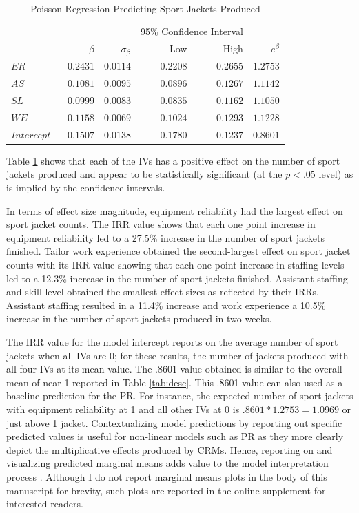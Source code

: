 \documentclass[doc]{apa7}
\begin{document}
	\begin{table}[h!]
		\centering
		\caption{\centering Poisson Regression Predicting Sport Jackets Produced} 
		\begin{tabular}{l|rrrrr}
			\hline %
			\multicolumn{1}{l}{} &  &  & \multicolumn{2}{c}{95\% Confidence Interval} &   \\ 
			\multicolumn{1}{l}{} & $\beta$ & $\sigma_{\beta}$ & Low & High & $e^{\beta}$ \\ 
			\hline %
			$ER$ & $0.2431$ & $0.0114$ & $0.2208$ & $0.2655$ & $1.2753$ \\  
			$AS$ & $0.1081$ & $0.0095$ & $0.0896$ & $0.1267$ & $1.1142$ \\ 
			$SL$ & $0.0999$ & $0.0083$ & $0.0835$ & $0.1162$ & $1.1050$ \\
			$WE$ & $0.1158$ & $0.0069$ & $0.1024$ & $0.1293$ & $1.1228$ \\ 
			$Intercept$ & $-0.1507$ & $0.0138$ & $-0.1780$ & $-0.1237$ & $0.8601$ \\
			\hline %
		\end{tabular}
		\label{tab:poisreg}
	\end{table}

	Table \ref{tab:poisreg} shows that each of the IVs has a positive effect on the number of sport jackets produced and appear to be statistically significant (at the $p < .05$ level) as is implied by the confidence intervals.
	
	In terms of effect size magnitude, equipment reliability had the largest effect on sport jacket counts. 
	The IRR value shows that each one point increase in equipment reliability led to a 27.5\% increase in the number of sport jackets finished.
	Tailor work experience obtained the second-largest effect on sport jacket counts with its IRR value showing that each one point increase in staffing levels led to a 12.3\% increase in the number of sport jackets finished.
	Assistant staffing and skill level obtained the smallest effect sizes as reflected by their IRRs.
	Assistant staffing resulted in a 11.4\% increase and work experience a 10.5\% increase in the number of sport jackets produced in two weeks. 
	
	The IRR value for the model intercept reports on the average number of sport jackets when all IVs are 0; for these results, the number of jackets produced with all four IVs at its mean value. 
	The .8601 value obtained is similar to the overall mean of near 1 reported in Table \ref{tab:desc}.
	This .8601 value can also used as a baseline prediction for the PR.
	For instance, the expected number of sport jackets with equipment reliability at 1 and all other IVs at 0 is $.8601*1.2753 = 1.0969$ or just above 1 jacket.
	Contextualizing model predictions by reporting out specific predicted values is useful for non-linear models such as PR as they more clearly depict the multiplicative effects produced by CRMs.
	Hence, reporting on and visualizing predicted marginal means adds value to the model interpretation process \parencite[see][for a similar perspective]{ronkko2022eight}.
	Although I do not report marginal means plots in the body of this manuscript for brevity, such plots are reported in the online supplement for interested readers.
	
\end{document}

